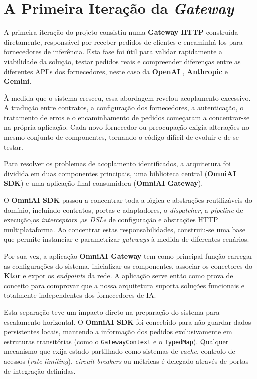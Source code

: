     \section{A Primeira Iteração da \textit{Gateway}}

    A primeira iteração do projeto consistiu numa \textbf{Gateway} \textbf{HTTP} construída diretamente, responsável por receber pedidos de clientes e encaminhá-los para fornecedores de inferência. Esta fase foi útil para validar rapidamente a viabilidade da solução, testar pedidos reais e compreender diferenças entre as diferentes API's dos fornecedores, neste caso da \textbf{OpenAI} \cite{openai_api}, \textbf{Anthropic}\cite{anthropic_api} e \textbf{Gemini}\cite{google_gemini_api}.

    À medida que o sistema cresceu, essa abordagem revelou acoplamento excessivo. A tradução entre contratos, a configuração dos fornecedores, a autenticação, o tratamento de erros e o encaminhamento de pedidos começaram a concentrar-se na própria aplicação. Cada novo fornecedor ou preocupação exigia alterações no mesmo conjunto de componentes, tornando o código difícil de evoluir e de se testar.

Para resolver os problemas de acoplamento identificados, a arquitetura foi dividida em duas componentes principais, uma biblioteca central (\textbf{OmniAI SDK}) e uma aplicação final consumidora (\textbf{OmniAI Gateway}).

O \textbf{OmniAI SDK} passou a concentrar toda a lógica e abstrações reutilizáveis do domínio, incluindo contratos, portas e adaptadores, o 
\textit{dispatcher}, a \textit{pipeline} de execução,os \textit{interceptors} ,as \textit{DSLs} de configuração e abstrações HTTP multiplataforma. Ao concentrar estas responsabilidades, construiu-se uma base que permite instanciar e parametrizar \textit{gateways} à medida de diferentes cenários.

Por sua vez, a aplicação \textbf{OmniAI Gateway} tem como principal função carregar as configurações do sistema, inicializar os componentes, associar os conectores do \textbf{Ktor} e expor os \textit{endpoints} da rede. A aplicação serve então como prova de conceito para comprovar que a nossa arquitetura suporta soluções funcionais e totalmente independentes dos fornecedores de IA.

Esta separação teve um impacto direto na preparação do sistema para escalamento horizontal. O \textbf{OmniAI SDK} foi concebido para não guardar dados persistentes locais, mantendo a informação dos pedidos exclusivamente em estruturas transitórias (como o \texttt{GatewayContext} e o \texttt{TypedMap}). Qualquer mecanismo que exija estado partilhado como sistemas de \textit{cache}, controlo de acessos (\textit{rate limiting}), \textit{circuit breakers} ou métricas é delegado através de portas de integração definidas.

